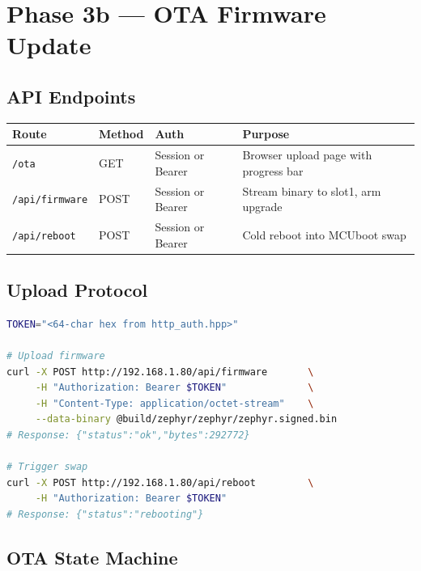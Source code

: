 \documentclass[11pt,a4paper]{article}
\begin{document}
\section{Phase 3b — OTA Firmware Update}

\subsection{API Endpoints}

\begin{center}
\begin{tabular}{@{}lllp{5cm}@{}}
\toprule
\textbf{Route} & \textbf{Method} & \textbf{Auth} & \textbf{Purpose} \\
\midrule
\texttt{/ota}           & GET  & Session or Bearer & Browser upload page with progress bar \\
\texttt{/api/firmware}  & POST & Session or Bearer & Stream binary to slot1, arm upgrade \\
\texttt{/api/reboot}    & POST & Session or Bearer & Cold reboot into MCUboot swap \\
\bottomrule
\end{tabular}
\end{center}

\subsection{Upload Protocol}

\begin{lstlisting}[language=bash, caption={OTA via curl}]
TOKEN="<64-char hex from http_auth.hpp>"

# Upload firmware
curl -X POST http://192.168.1.80/api/firmware       \
     -H "Authorization: Bearer $TOKEN"              \
     -H "Content-Type: application/octet-stream"    \
     --data-binary @build/zephyr/zephyr/zephyr.signed.bin
# Response: {"status":"ok","bytes":292772}

# Trigger swap
curl -X POST http://192.168.1.80/api/reboot         \
     -H "Authorization: Bearer $TOKEN"
# Response: {"status":"rebooting"}
\end{lstlisting}

\subsection{OTA State Machine}
\end{document}
